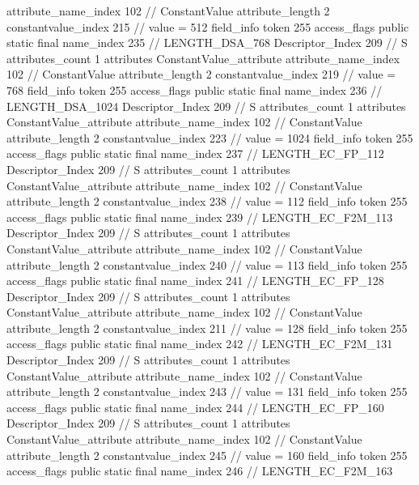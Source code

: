 {{{{{{{					attribute_name_index	102		// ConstantValue
					attribute_length	2
					constantvalue_index	215		// value = 512
				}
				}
			}
			field_info {
				token	255
				access_flags	public static final
				name_index	235		// LENGTH_DSA_768
				Descriptor_Index	209		// S
				attributes_count	1
				attributes {
				ConstantValue_attribute {
					attribute_name_index	102		// ConstantValue
					attribute_length	2
					constantvalue_index	219		// value = 768
				}
				}
			}
			field_info {
				token	255
				access_flags	public static final
				name_index	236		// LENGTH_DSA_1024
				Descriptor_Index	209		// S
				attributes_count	1
				attributes {
				ConstantValue_attribute {
					attribute_name_index	102		// ConstantValue
					attribute_length	2
					constantvalue_index	223		// value = 1024
				}
				}
			}
			field_info {
				token	255
				access_flags	public static final
				name_index	237		// LENGTH_EC_FP_112
				Descriptor_Index	209		// S
				attributes_count	1
				attributes {
				ConstantValue_attribute {
					attribute_name_index	102		// ConstantValue
					attribute_length	2
					constantvalue_index	238		// value = 112
				}
				}
			}
			field_info {
				token	255
				access_flags	public static final
				name_index	239		// LENGTH_EC_F2M_113
				Descriptor_Index	209		// S
				attributes_count	1
				attributes {
				ConstantValue_attribute {
					attribute_name_index	102		// ConstantValue
					attribute_length	2
					constantvalue_index	240		// value = 113
				}
				}
			}
			field_info {
				token	255
				access_flags	public static final
				name_index	241		// LENGTH_EC_FP_128
				Descriptor_Index	209		// S
				attributes_count	1
				attributes {
				ConstantValue_attribute {
					attribute_name_index	102		// ConstantValue
					attribute_length	2
					constantvalue_index	211		// value = 128
				}
				}
			}
			field_info {
				token	255
				access_flags	public static final
				name_index	242		// LENGTH_EC_F2M_131
				Descriptor_Index	209		// S
				attributes_count	1
				attributes {
				ConstantValue_attribute {
					attribute_name_index	102		// ConstantValue
					attribute_length	2
					constantvalue_index	243		// value = 131
				}
				}
			}
			field_info {
				token	255
				access_flags	public static final
				name_index	244		// LENGTH_EC_FP_160
				Descriptor_Index	209		// S
				attributes_count	1
				attributes {
				ConstantValue_attribute {
					attribute_name_index	102		// ConstantValue
					attribute_length	2
					constantvalue_index	245		// value = 160
				}
				}
			}
			field_info {
				token	255
				access_flags	public static final
				name_index	246		// LENGTH_EC_F2M_163
}}}}}
